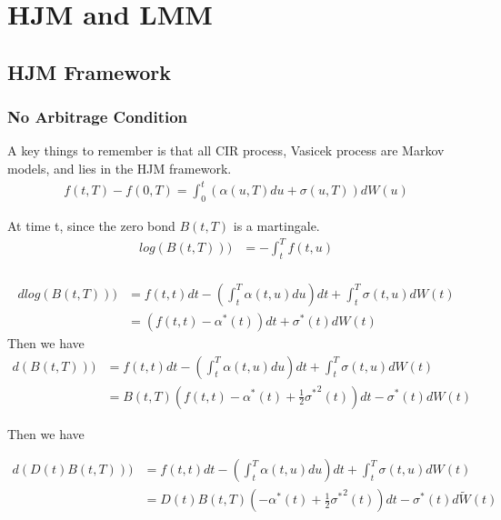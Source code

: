 \newpage
\section{HJM and LMM}
\subsection{HJM Framework}
\subsubsection{No Arbitrage Condition}
A key things to remember is that {\color{red}all CIR process, Vasicek process are Markov models, and lies in the HJM framework}.
\begin{equation}
\begin{aligned}
f(t, T) - f(0, T) =  \int_0^t (\alpha(u, T)du + \sigma(u, T)) dW(u)
\end{aligned}
\end{equation}

At time t, since the zero bond $B(t, T)$ is a martingale.
 \begin{equation}
\begin{aligned}
log(B(t, T))) &= -\int_t^Tf(t, u)\\
\end{aligned}
\end{equation}

 \begin{equation}
\begin{aligned}
dlog(B(t, T))) &= f(t, t)dt - (\int_t^T \alpha(t, u) du)dt +\int_t^T \sigma(t, u) dW(t) \\
                     &= (f(t, t) - \alpha^\ast(t))dt + \sigma^\ast(t) dW(t)
\end{aligned}
\end{equation}
Then we have
 \begin{equation}
\begin{aligned}
d(B(t, T))) &= f(t, t)dt - (\int_t^T \alpha(t, u) du)dt +\int_t^T \sigma(t, u) dW(t) \\
                     &=B(t, T) (f(t, t) - \alpha^\ast(t) + \frac{1}{2} {\sigma^\ast}^2(t)) dt - \sigma^\ast(t) dW(t)
\end{aligned}
\end{equation}

Then we have

\begin{equation}
\begin{aligned}
d(D(t)B(t, T))) &= f(t, t)dt - (\int_t^T \alpha(t, u) du)dt +\int_t^T \sigma(t, u) dW(t) \\
                     &=D(t)B(t, T) (-\alpha^\ast(t) + \frac{1}{2} {\sigma^\ast}^2(t)) dt - \sigma^\ast(t) d\widetilde{W}(t)
\end{aligned}
\end{equation}

